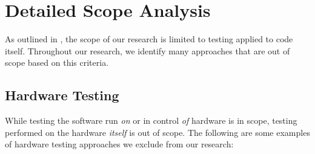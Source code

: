 \chapter{Detailed Scope Analysis}\label{app-scope}

As outlined in , the scope of our research is limited to
testing applied to code itself. Throughout our research, we identify many
approaches that are out of scope based on this criteria.

\section{Hardware Testing}\label{hard-test}
While testing the software run \emph{on} or in control \emph{of} hardware is in
scope, testing performed on the hardware \emph{itself} is out of scope. The
following are some examples of hardware testing approaches we exclude from our
research:

